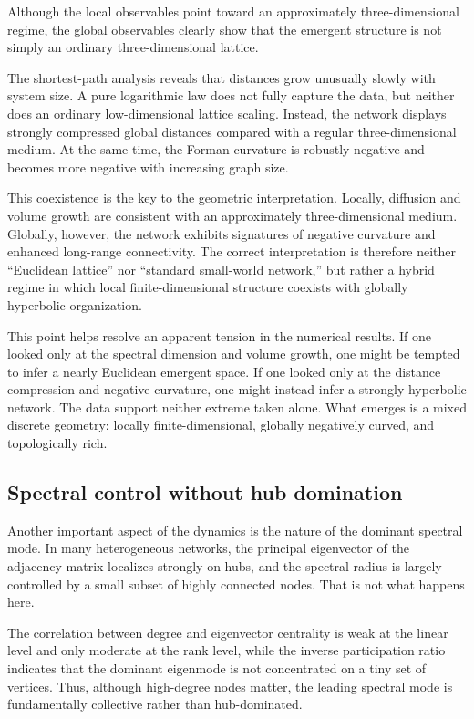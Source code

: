 \documentclass[11pt]{article}
\begin{document}
Although the local observables point toward an approximately three-dimensional regime, the global observables clearly show that the emergent structure is not simply an ordinary three-dimensional lattice.

The shortest-path analysis reveals that distances grow unusually slowly with system size.
A pure logarithmic law does not fully capture the data, but neither does an ordinary low-dimensional lattice scaling.
Instead, the network displays strongly compressed global distances compared with a regular three-dimensional medium.
At the same time, the Forman curvature is robustly negative and becomes more negative with increasing graph size.

This coexistence is the key to the geometric interpretation.
Locally, diffusion and volume growth are consistent with an approximately three-dimensional medium.
Globally, however, the network exhibits signatures of negative curvature and enhanced long-range connectivity.
The correct interpretation is therefore neither ``Euclidean lattice'' nor ``standard small-world network,'' but rather a hybrid regime in which local finite-dimensional structure coexists with globally hyperbolic organization.

This point helps resolve an apparent tension in the numerical results.
If one looked only at the spectral dimension and volume growth, one might be tempted to infer a nearly Euclidean emergent space.
If one looked only at the distance compression and negative curvature, one might instead infer a strongly hyperbolic network.
The data support neither extreme taken alone.
What emerges is a mixed discrete geometry:
locally finite-dimensional, globally negatively curved, and topologically rich.

\subsection{Spectral control without hub domination}

Another important aspect of the dynamics is the nature of the dominant spectral mode.
In many heterogeneous networks, the principal eigenvector of the adjacency matrix localizes strongly on hubs, and the spectral radius is largely controlled by a small subset of highly connected nodes.
That is not what happens here.

The correlation between degree and eigenvector centrality is weak at the linear level and only moderate at the rank level, while the inverse participation ratio indicates that the dominant eigenmode is not concentrated on a tiny set of vertices.
Thus, although high-degree nodes matter, the leading spectral mode is fundamentally collective rather than hub-dominated.
\end{document}
